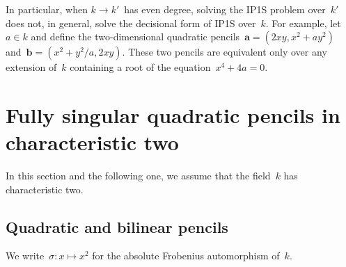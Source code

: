 \documentclass{article}%
\begin{document}
% 

In particular, when $k → k'$~has even degree,
solving the IP1S problem over~$k'$
does not, in general, solve the decisional form of IP1S over~$k$.
For example, let~$a ∈ k$ and define the two-dimensional
quadratic pencils~$\bm{a} = (2 x y, x^2 + a y^2)$
and~$\bm{b} = (x^2 + y^2/a, 2 x y)$.
These two pencils are equivalent only over any extension of~$k$
containing a root of the equation~$x^4 + 4 a = 0$.


\section{Fully singular quadratic pencils in characteristic two}%
\label{S:quad-sing}
In this section and the following one, we assume that the field~$k$ has
characteristic two.

\subsection{Quadratic and bilinear pencils}%

We write~$σ: x ↦ x^2$ for the absolute Frobenius automorphism of~$k$.
\end{document}
